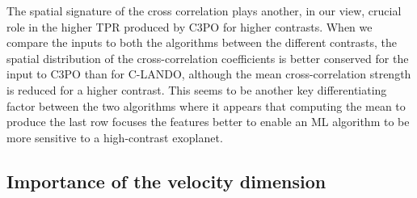 \documentclass{aa}
\begin{document}
The spatial signature of the cross correlation plays another, in our view, crucial role in the higher TPR produced by C3PO for higher contrasts.
When we compare the inputs to both the algorithms between the different contrasts, the spatial distribution of the cross-correlation coefficients is better conserved for the input to C3PO than for C-LANDO, although the mean cross-correlation strength is reduced for a higher contrast.
This seems to be another key differentiating factor between the two algorithms where it appears that computing the mean to produce the last row focuses the features better to enable an ML algorithm to be more sensitive to a high-contrast exoplanet.

\subsection{Importance of the velocity dimension}
\end{document}
